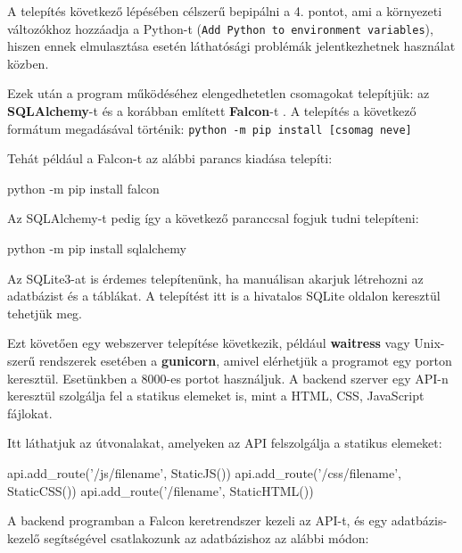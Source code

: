 A telepítés következő lépésében célszerű bepipálni a 4. pontot, ami a környezeti változókhoz hozzáadja a Python-t (\texttt{Add Python to environment variables}), hiszen ennek elmulasztása esetén láthatósági problémák jelentkezhetnek használat közben.


Ezek után a program működéséhez elengedhetetlen csomagokat telepítjük: az \textbf{SQLAlchemy}-t  \cite{sqlalchemy} és a korábban említett \textbf{Falcon}-t \cite{falcon}. A telepítés a következő formátum megadásával történik: \texttt{python -m pip install [csomag neve]}

Tehát például a Falcon-t az alábbi parancs kiadása telepíti:

\begin{python}
python -m pip install falcon
\end{python}

Az SQLAlchemy-t pedig így a következő paranccsal fogjuk tudni telepíteni:
\begin{python}
python -m pip install sqlalchemy
\end{python}

Az SQLite3-at is érdemes telepítenünk, ha manuálisan akarjuk létrehozni az adatbázist és a táblákat. A telepítést itt is a hivatalos SQLite oldalon \cite{sqlite} keresztül tehetjük meg.

Ezt követően egy webszerver telepítése következik, például \textbf{waitress} vagy Unix-szerű rendszerek esetében a \textbf{gunicorn}, amivel elérhetjük a programot egy porton keresztül. Esetünkben a 8000-es portot használjuk. A backend szerver egy API-n keresztül szolgálja fel a statikus elemeket is, mint a HTML, CSS, JavaScript fájlokat.
 
Itt láthatjuk az útvonalakat, amelyeken az API felszolgálja a statikus elemeket:

\begin{python}
api.add_route('/js/{filename}', StaticJS())
api.add_route('/css/{filename}', StaticCSS())
api.add_route('/{filename}', StaticHTML())
\end{python}

A backend programban a Falcon keretrendszer kezeli az API-t, és egy adatbázis-kezelő segítségével csatlakozunk az adatbázishoz az alábbi módon:

